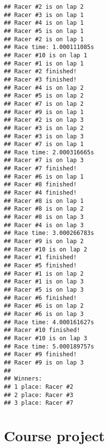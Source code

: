 \documentclass[]{book}
\begin{document}
\begin{verbatim}
## Racer #2 is on lap 2
## Racer #3 is on lap 1
## Racer #4 is on lap 1
## Racer #5 is on lap 1
## Racer #2 is on lap 1
## Race time: 1.000111085s
## Racer #10 is on lap 1
## Racer #1 is on lap 1
## Racer #2 finished!
## Racer #3 finished!
## Racer #4 is on lap 2
## Racer #5 is on lap 2
## Racer #7 is on lap 2
## Racer #9 is on lap 1
## Racer #2 is on lap 3
## Racer #3 is on lap 2
## Racer #3 is on lap 3
## Racer #7 is on lap 1
## Race time: 2.000316665s
## Racer #7 is on lap 3
## Racer #7 finished!
## Racer #6 is on lap 1
## Racer #8 finished!
## Racer #4 finished!
## Racer #8 is on lap 1
## Racer #8 is on lap 2
## Racer #8 is on lap 3
## Racer #4 is on lap 3
## Race time: 3.000266783s
## Racer #9 is on lap 2
## Racer #10 is on lap 2
## Racer #1 finished!
## Racer #5 finished!
## Racer #1 is on lap 2
## Racer #1 is on lap 3
## Racer #5 is on lap 3
## Racer #6 finished!
## Racer #6 is on lap 2
## Racer #6 is on lap 3
## Race time: 4.000161627s
## Racer #10 finished!
## Racer #10 is on lap 3
## Race time: 5.000189757s
## Racer #9 finished!
## Racer #9 is on lap 3
## 
## Winners:
## 1 place: Racer #2
## 2 place: Racer #3
## 3 place: Racer #7
\end{verbatim}

\hypertarget{course-project}{%
\chapter*{Course project}\label{course-project}}
\end{document}

